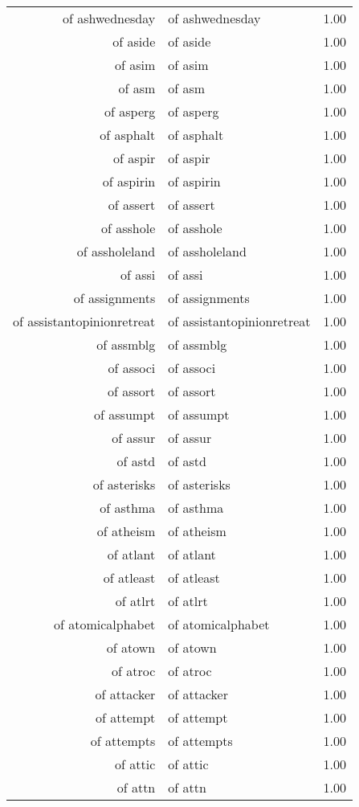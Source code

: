 \begin{table}[ht]
\begin{tabular}{rlr}
  of ashwednesday & of ashwednesday & 1.00 \\ 
  of aside & of aside & 1.00 \\ 
  of asim & of asim & 1.00 \\ 
  of asm & of asm & 1.00 \\ 
  of asperg & of asperg & 1.00 \\ 
  of asphalt & of asphalt & 1.00 \\ 
  of aspir & of aspir & 1.00 \\ 
  of aspirin & of aspirin & 1.00 \\ 
  of assert & of assert & 1.00 \\ 
  of asshole & of asshole & 1.00 \\ 
  of assholeland & of assholeland & 1.00 \\ 
  of assi & of assi & 1.00 \\ 
  of assignments & of assignments & 1.00 \\ 
  of assistantopinionretreat & of assistantopinionretreat & 1.00 \\ 
  of assmblg & of assmblg & 1.00 \\ 
  of associ & of associ & 1.00 \\ 
  of assort & of assort & 1.00 \\ 
  of assumpt & of assumpt & 1.00 \\ 
  of assur & of assur & 1.00 \\ 
  of astd & of astd & 1.00 \\ 
  of asterisks & of asterisks & 1.00 \\ 
  of asthma & of asthma & 1.00 \\ 
  of atheism & of atheism & 1.00 \\ 
  of atlant & of atlant & 1.00 \\ 
  of atleast & of atleast & 1.00 \\ 
  of atlrt & of atlrt & 1.00 \\ 
  of atomicalphabet & of atomicalphabet & 1.00 \\ 
  of atown & of atown & 1.00 \\ 
  of atroc & of atroc & 1.00 \\ 
  of attacker & of attacker & 1.00 \\ 
  of attempt & of attempt & 1.00 \\ 
  of attempts & of attempts & 1.00 \\ 
  of attic & of attic & 1.00 \\ 
  of attn & of attn & 1.00 \\ 

\end{tabular}
\end{table}
